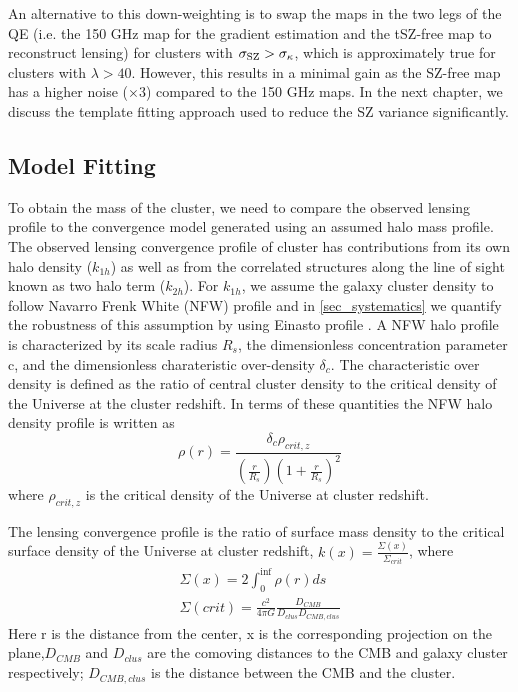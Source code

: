 An alternative to this down-weighting is to swap the maps in the two legs of the QE (i.e. the 150 GHz map for the gradient estimation and the tSZ-free map to reconstruct lensing) for clusters with \mbox{$\sigma_{\rm SZ} > \sigma_{\kappa}$}, which is approximately true for clusters with $\lambda > 40$. However, this results in a minimal gain as the \sptpol{} SZ-free map has a higher noise ($\times3$) compared to the \sptpol{} 150 GHz maps. 
In the next chapter, we discuss the template fitting approach used to reduce the SZ variance significantly.
 \subsection{Model Fitting}
 \label{sec:model_fitting}
To obtain the mass of the cluster, we need to compare the observed lensing profile to the convergence model generated using an assumed halo mass profile.
 The observed lensing convergence profile of cluster has contributions from its own halo density ($k_{1h}$) as well as from the correlated structures along the line of sight known as two halo term ($k_{2h}$).
 For $k_{1h}$, we assume the galaxy cluster density to follow Navarro Frenk White (NFW) profile and in \ref{sec_systematics} we quantify the robustness of this assumption by using Einasto profile \citep{Einasto}.
 A NFW halo profile is characterized by its scale radius $R_{s}$, the dimensionless concentration parameter c, and the dimensionless charateristic over-density $\delta_{c}$.
 The characteristic over density is defined as the ratio of central cluster density to the critical density of the Universe at the cluster redshift.
 In terms of these quantities the NFW halo density profile is written as 
 \begin{equation}
 \rho(r) = \frac{\delta_{c}\rho_{crit,z}}{(\frac{r}{R_{s}})(1 + \frac{r}{R_{s}})^{2}}
 \end{equation} 
 where $\rho_{crit,z}$ is the critical density of the Universe at cluster redshift.
 
 The lensing convergence profile is the ratio of surface mass density to the critical surface density of the Universe at cluster redshift, $k(x) = \frac{\Sigma(x)}{\Sigma_{crit}}$, where
 \begin{eqnarray}
 \Sigma(x) = 2 \int^{\inf}_{0} \rho(r) ds\\
 \Sigma(crit) = \frac{c^{2}}{4\pi G} \frac{D_{CMB}}{D_{clus} D_{CMB,clus}} 
 \end{eqnarray} 
Here r is the distance from the center, x is the corresponding projection on the plane,$D_{CMB}$ and $D_{clus}$ are the comoving distances to the CMB and galaxy cluster respectively; $D_{CMB,clus}$ is the distance between the CMB and the cluster.

